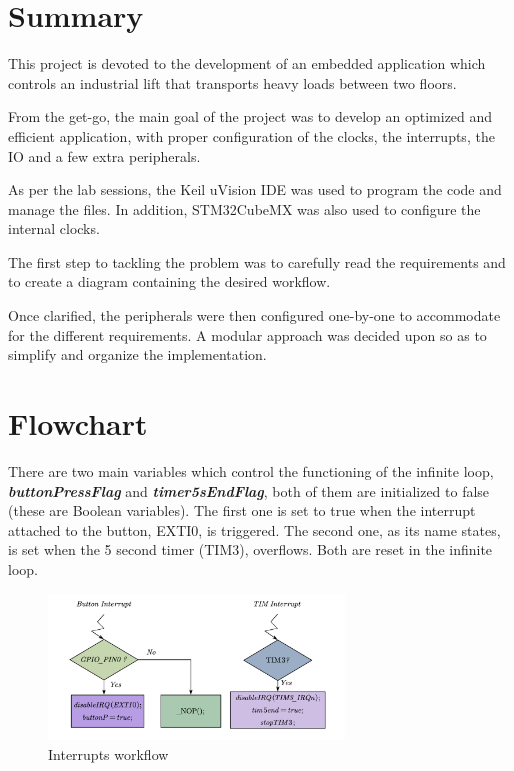 \section*{Summary}

This project is devoted to the development of an embedded application which controls an industrial lift that transports heavy loads between two floors.\medskip

From the get-go, the main goal of the project was to develop an optimized and efficient application, with proper configuration of the clocks, the interrupts, the IO and a few extra peripherals. \medskip

As per the lab sessions, the Keil uVision IDE was used to program the code and manage the files. In addition, STM32CubeMX was also used to configure the internal clocks.\medskip

The first step to tackling the problem was to carefully read the requirements and to create a diagram containing the desired workflow.\medskip

Once clarified, the peripherals were then configured one-by-one to accommodate for the different requirements. A modular approach was decided upon so as to simplify and organize the implementation. 

\section{Flowchart}
There are two main variables which control the functioning of the infinite loop, \textbf{\textit{buttonPressFlag}} and \textbf{\textit{timer5sEndFlag}}, both of them are initialized to false (these are Boolean variables). The first one is set to true when the interrupt attached to the button, EXTI0, is triggered. The second one, as its name states, is set when the 5 second timer (TIM3), overflows. Both are reset in the infinite loop.

\begin{figure}[H]
    \centering
    \includegraphics[width=0.7\textwidth]{Graphics/AXGLYPH_PDF/TIM_ISR.pdf}
    \caption{Interrupts workflow}
    \label{fig:Interrupts_workflow}
\end{figure}

